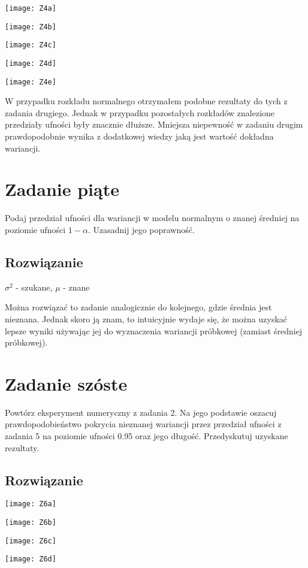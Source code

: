 \documentclass[a4paper]{article}
\begin{document}
\texttt{[image: Z4a]}

\texttt{[image: Z4b]}

\texttt{[image: Z4c]}

\texttt{[image: Z4d]}

\texttt{[image: Z4e]}

W przypadku rozkładu normalnego otrzymałem podobne rezultaty do tych z zadania drugiego. Jednak w przypadku pozostałych rozkładów znalezione przedziały ufności były znacznie dłuższe. Mniejsza niepewność w zadaniu drugim prawdopodobnie wynika z dodatkowej wiedzy jaką jest wartość dokładna wariancji.

\section{Zadanie piąte}
Podaj przedział ufności dla wariancji w modelu normalnym o znanej średniej na poziomie ufności $1-\alpha$. Uzasadnij jego poprawność.

\subsection{Rozwiązanie}
$\sigma^2$ - szukane, $\mu$ - znane

Można rozwiązać to zadanie analogicznie do kolejnego, gdzie średnia jest nieznana. Jednak skoro ją znam, to intuicyjnie wydaje się, że można uzyskać lepsze wyniki używając jej do wyznaczenia wariancji próbkowej (zamiast średniej próbkowej).


\section{Zadanie szóste}
Powtórz eksperyment numeryczny z zadania 2. Na jego podstawie oszacuj prawdopodobieństwo pokrycia nieznanej wariancji przez przedział ufności z zadania 5 na poziomie ufności 0.95 oraz jego długość. Przedyskutuj uzyskane rezultaty.

\subsection{Rozwiązanie}

\texttt{[image: Z6a]}

\texttt{[image: Z6b]}

\texttt{[image: Z6c]}

\texttt{[image: Z6d]}
\end{document}
